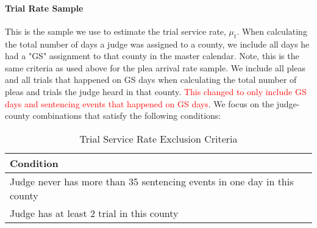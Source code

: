 \documentclass[11pt]{article}
\begin{document}
      \paragraph{Trial Rate Sample} This is the sample we use to estimate the trial service rate, $\mu_t$. When calculating the total number of days a judge was assigned to a county, we include all days he had a "GS" assignment to that county in the master calendar. Note, this is the same criteria as used above for the plea arrival rate sample. We include all pleas and all trials that happened on GS days when calculating the total number of pleas and trials the judge heard in that county. \textcolor{red}{This changed to only include GS days and sentencing events that happened on GS days}. We focus on the judge-county combinations that satisfy the following conditions:

        \begin{table}[H]
        \centering
        \caption{Trial Service Rate Exclusion Criteria}
        \begin{tabular}{|l|}
        \hline
        \textbf{Condition}                                                       \\ \hline
        Judge never has more than 35 sentencing events in one day in this county \\
        Judge has at least 2 trial in this county                                \\ \hline
        \end{tabular}
        \end{table}

\end{document}
